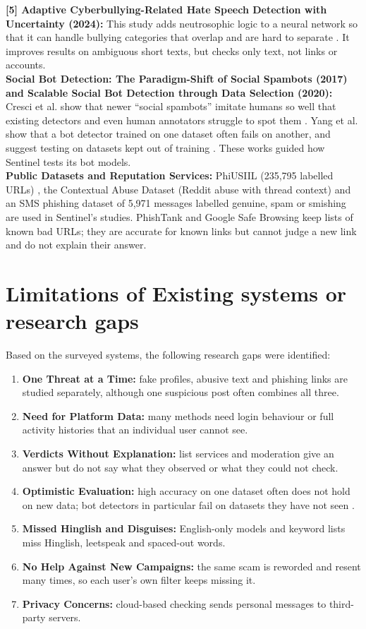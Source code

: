 \noindent\textbf{[5] Adaptive Cyberbullying-Related Hate Speech Detection with Uncertainty (2024):} This study adds neutrosophic logic to a neural network so that it can handle bullying categories that overlap and are hard to separate \cite{lit5}. It improves results on ambiguous short texts, but checks only text, not links or accounts.\\

\noindent\textbf{Social Bot Detection: The Paradigm-Shift of Social Spambots (2017) and Scalable Social Bot Detection through Data Selection (2020):} Cresci et al. show that newer ``social spambots'' imitate humans so well that existing detectors and even human annotators struggle to spot them \cite{cresci2017}. Yang et al. show that a bot detector trained on one dataset often fails on another, and suggest testing on datasets kept out of training \cite{yang2020}. These works guided how Sentinel tests its bot models.\\

\noindent\textbf{Public Datasets and Reputation Services:} PhiUSIIL (235,795 labelled URLs) \cite{phiusiil}, the Contextual Abuse Dataset (Reddit abuse with thread context) \cite{cad} and an SMS phishing dataset of 5,971 messages labelled genuine, spam or smishing \cite{smsdata} are used in Sentinel's studies. PhishTank \cite{phishtank} and Google Safe Browsing \cite{safebrowsing} keep lists of known bad URLs; they are accurate for known links but cannot judge a new link and do not explain their answer.

\section{Limitations of Existing systems or research gaps}
\noindent Based on the surveyed systems, the following research gaps were identified:
\begin{enumerate}
\item \textbf{One Threat at a Time:} fake profiles, abusive text and phishing links are studied separately, although one suspicious post often combines all three.
\item \textbf{Need for Platform Data:} many methods need login behaviour or full activity histories that an individual user cannot see.
\item \textbf{Verdicts Without Explanation:} list services and moderation give an answer but do not say what they observed or what they could not check.
\item \textbf{Optimistic Evaluation:} high accuracy on one dataset often does not hold on new data; bot detectors in particular fail on datasets they have not seen \cite{yang2020}.
\item \textbf{Missed Hinglish and Disguises:} English-only models and keyword lists miss Hinglish, leetspeak and spaced-out words.
\item \textbf{No Help Against New Campaigns:} the same scam is reworded and resent many times, so each user's own filter keeps missing it.
\item \textbf{Privacy Concerns:} cloud-based checking sends personal messages to third-party servers.
\end{enumerate}

